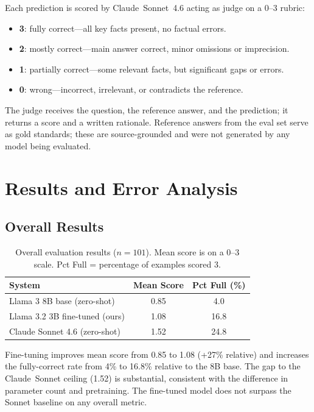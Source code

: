 \documentclass[11pt]{article}
\begin{document}
Each prediction is scored by Claude~Sonnet~4.6 acting as judge \citep{zheng2023judging} on a 0--3 rubric:
\begin{itemize}[nosep]
  \item \textbf{3}: fully correct---all key facts present, no factual errors.
  \item \textbf{2}: mostly correct---main answer correct, minor omissions or imprecision.
  \item \textbf{1}: partially correct---some relevant facts, but significant gaps or errors.
  \item \textbf{0}: wrong---incorrect, irrelevant, or contradicts the reference.
\end{itemize}
The judge receives the question, the reference answer, and the prediction; it returns a score and a written rationale. Reference answers from the eval set serve as gold standards; these are source-grounded and were not generated by any model being evaluated.

\section{Results and Error Analysis}
\label{sec:results}

\subsection{Overall Results}

\begin{table}[ht]
  \centering
  \caption{Overall evaluation results ($n=101$). Mean score is on a 0--3 scale. Pct Full = percentage of examples scored 3.}
  \label{tab:results}
  \begin{tabular}{lcc}
    \toprule
    System & Mean Score & Pct Full (\%) \\
    \midrule
    Llama 3 8B base (zero-shot) & 0.85 & 4.0 \\
    Llama 3.2 3B fine-tuned (ours) & 1.08 & 16.8 \\
    Claude Sonnet 4.6 (zero-shot) & 1.52 & 24.8 \\
    \bottomrule
  \end{tabular}
\end{table}

Fine-tuning improves mean score from 0.85 to 1.08 (+27\% relative) and increases the fully-correct rate from 4\% to 16.8\% relative to the 8B base. The gap to the Claude~Sonnet ceiling (1.52) is substantial, consistent with the difference in parameter count and pretraining. The fine-tuned model does not surpass the Sonnet baseline on any overall metric.
\end{document}
